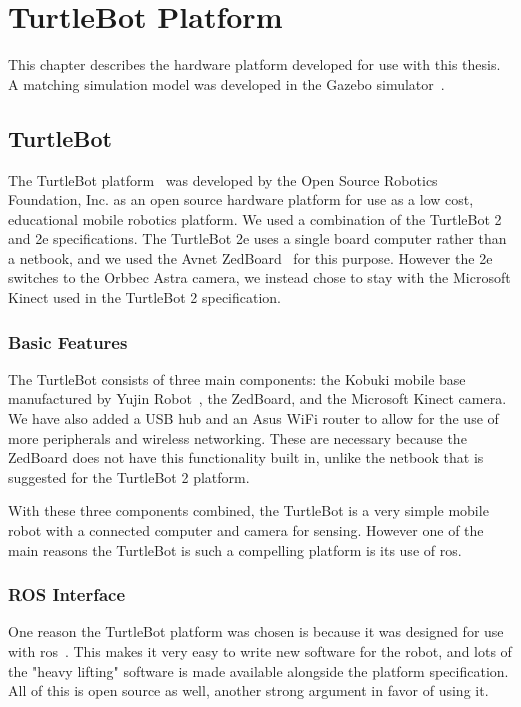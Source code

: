 \documentclass[thesis.tex]{subfile}
\begin{document}
\chapter{TurtleBot Platform} \label{Hardware Platform}
This chapter describes the hardware platform developed for use with this thesis. A matching simulation model was developed in the Gazebo simulator~\cite{Koenig}.

\section{TurtleBot}
The TurtleBot platform~\cite{TurtleBot} was developed by the Open Source Robotics Foundation, Inc. as an open source hardware platform for use as a low cost, educational mobile robotics platform. We used a combination of the TurtleBot 2 and 2e specifications. The TurtleBot 2e uses a single board computer rather than a netbook, and we used the Avnet ZedBoard~\cite{ZedBoard} for this purpose. However the 2e switches to the Orbbec Astra camera, we instead chose to stay with the Microsoft Kinect used in the TurtleBot 2 specification.

\subsection{Basic Features}
The TurtleBot consists of three main components: the Kobuki mobile base manufactured by Yujin Robot~\cite{Kobuki}, the ZedBoard, and the Microsoft Kinect camera. We have also added a USB hub and an Asus WiFi router to allow for the use of more peripherals and wireless networking. These are necessary because the ZedBoard does not have this functionality built in, unlike the netbook that is suggested for the TurtleBot 2 platform.

With these three components combined, the TurtleBot is a very simple mobile robot with a connected computer and camera for sensing. However one of the main reasons the TurtleBot is such a compelling platform is its use of \gls{ros}.

\subsection{ROS Interface}
One reason the TurtleBot platform was chosen is because it was designed for use with \gls{ros}~\cite{TurtleBotWiki}. This makes it very easy to write new software for the robot, and lots of the "heavy lifting" software is made available alongside the platform specification. All of this is open source as well, another strong argument in favor of using it.
\end{document}
